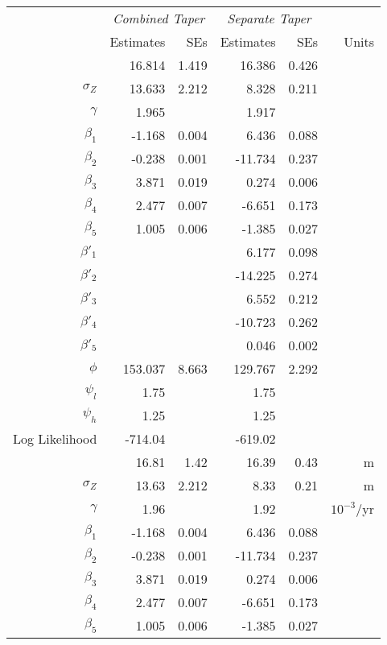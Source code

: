 {\begin{table}[ht]
\centering
\begin{tabular}{rrrrrr}
  \hline
  & \multicolumn{2}{c}{\textit{Combined Taper}} & \multicolumn{2}{c}{\textit{Separate Taper}} \\ 
 & Estimates & SEs & Estimates & SEs & Units \\ 
  \hline
  \begin{comment}
$\mu_Z$ & 16.814 & 1.419 & 16.386 & 0.426 \\ 
 $ \sigma_Z$ & 13.633 & 2.212 & 8.328 & 0.211 \\ 
  $\gamma$ & 1.965 &  & 1.917 &  \\ 
  $\beta_1$ & -1.168 & 0.004 & 6.436 & 0.088 \\ 
  $\beta_2$ & -0.238 & 0.001 & -11.734 & 0.237 \\ 
  $\beta_3$ & 3.871 & 0.019 & 0.274 & 0.006 \\ 
  $\beta_4$ & 2.477 & 0.007 & -6.651 & 0.173 \\ 
  $\beta_5$ & 1.005 & 0.006 & -1.385 & 0.027 \\ 
  $\beta'_1$ &  &  & 6.177 & 0.098 \\ 
  $\beta'_2$ &  &  & -14.225 & 0.274 \\ 
  $\beta'_3$ &  &  & 6.552 & 0.212 \\ 
  $\beta'_4$ &  &  & -10.723 & 0.262 \\ 
  $\beta'_5$ &  &  & 0.046 & 0.002 \\ 
  $\phi $& 153.037 & 8.663 & 129.767 & 2.292 \\ 
  $\psi_l$ & 1.75 &  & 1.75 &  \\ 
  $\psi_h$ & 1.25 &  & 1.25 &  \\ 
  Log Likelihood & -714.04 & & -619.02 & \\
  \end{comment}
  $\mu_Z$ & 16.81 & 1.42 & 16.39 & 0.43 & m\\ 
 $ \sigma_Z$ & 13.63 & 2.212& 8.33 & 0.21 & m\\ 
  $\gamma$ & 1.96 &  & 1.92 & & $10^{-3}$/yr \\ 
  $\beta_1$ & -1.168 & 0.004 & 6.436 & 0.088 &  \\ 
  $\beta_2$ & -0.238 & 0.001 & -11.734 & 0.237 & \\ 
  $\beta_3$ & 3.871 & 0.019 & 0.274 & 0.006 & \\ 
  $\beta_4$ & 2.477 & 0.007 & -6.651 & 0.173 & \\ 
  $\beta_5$ & 1.005 & 0.006 & -1.385 & 0.027 & \\ 

\end{tabular}
\end{table}}
